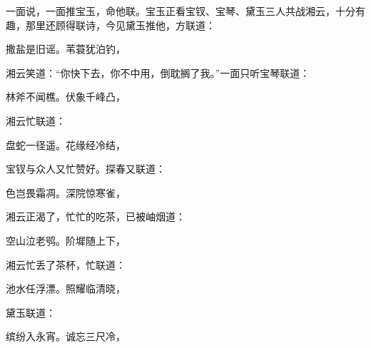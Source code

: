 \begin{parag}
    一面说，一面推宝玉，命他联。宝玉正看宝钗、宝琴、黛玉三人共战湘云，十分有趣，那里还顾得联诗，今见黛玉推他，方联道：
\end{parag}
\begin{poem}
    \begin{pl} 撒盐是旧谣。苇蓑犹泊钓，\end{pl}
\end{poem}


\begin{parag}
    湘云笑道：“你快下去，你不中用，倒耽搁了我。”一面只听宝琴联道：
\end{parag}
\begin{poem}
    \begin{pl} 林斧不闻樵。伏象千峰凸，\end{pl}
\end{poem}


\begin{parag}
    湘云忙联道：
\end{parag}
\begin{poem}
    \begin{pl} 盘蛇一径遥。花缘经冷结，\end{pl}
\end{poem}


\begin{parag}
    宝钗与众人又忙赞好。探春又联道：
\end{parag}
\begin{poem}
    \begin{pl} 色岂畏霜凋。深院惊寒雀，\end{pl}
\end{poem}


\begin{parag}
    湘云正渴了，忙忙的吃茶，已被岫烟道：
\end{parag}
\begin{poem}
    \begin{pl} 空山泣老鸮。阶墀随上下，\end{pl}
\end{poem}


\begin{parag}
    湘云忙丢了茶杯，忙联道：
\end{parag}
\begin{poem}
    \begin{pl} 池水任浮漂。照耀临清晓，\end{pl}
\end{poem}


\begin{parag}
    黛玉联道：
\end{parag}
\begin{poem}
    \begin{pl} 缤纷入永宵。诚忘三尺冷，\end{pl}
\end{poem}


